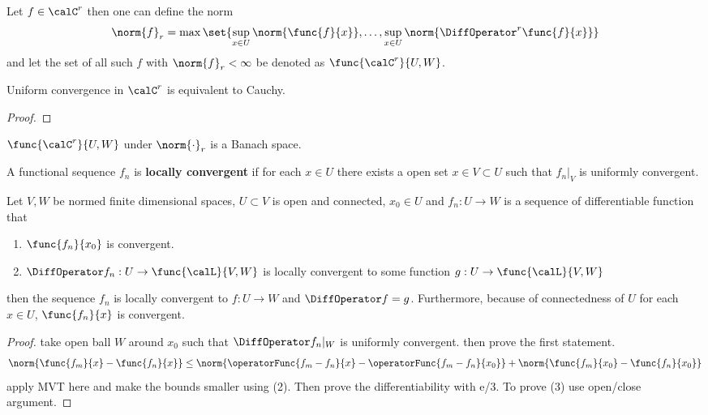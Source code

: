 Let \(f \in \calC^r\) then one can define the norm
\begin{equation*}
    \norm{f}_r = \max \set{\sup_{x \in U}\norm{\func{f}{x}}, \dots , \sup_{x \in U}\norm{\DiffOperator^r \func{f}{x}}}
\end{equation*}
and let the set of all such \(f\) with \(\norm{f}_r < \infty\) be denoted as \(\func{\calC^r}{U,W}\).

\begin{theorem}
    Uniform convergence in \(\calC^r\) is equivalent to Cauchy.
\end{theorem}

\begin{proof}

\end{proof}

\begin{theorem}
    \( \func{\calC^r}{U,W}\) under \(\norm{\cdot}_r\) is a Banach space.
\end{theorem}


\begin{definition}
    A functional sequence \(f_n\) is \textbf{locally convergent} if for each \(x \in U\)  there exists a open set \(x \in V \subset U\) such that \(\left. f_n \right|_V\) is uniformly convergent.
\end{definition}

\begin{theorem}
    Let \(V,W\) be normed finite dimensional spaces, \(U \subset V\) is open and connected, \(x_0 \in U\) and \(f_n : U \to W\) is a sequence of differentiable function that
    \begin{enumerate}
        \item \(\func{f_n}{x_0}\) is convergent.
        \item \(\DiffOperator f_n : U \to \func{\calL}{V,W}\) is locally convergent to some function \(g : U \to \func{\calL}{V,W}\)
    \end{enumerate}
    then the sequence \(f_n\) is locally convergent to \(f : U \to W\) and \(\DiffOperator f = g\). Furthermore, because of connectedness of \(U\) for each \(x \in U\), \(\func{f_n}{x}\) is convergent.
\end{theorem}

\begin{proof}
    take open ball \(W\) around \(x_0\) such that \(\DiffOperator f_n|_W\) is uniformly convergent. then prove the first statement.
    \begin{equation*}
        \norm{\func{f_m}{x} - \func{f_n}{x}} \leq \norm{\operatorFunc{f_m - f_n}{x} - \operatorFunc{f_m - f_n}{x_0}} + \norm{\func{f_m}{x_0} - \func{f_n}{x_0}}
    \end{equation*}
    apply MVT here and make the bounds smaller using (2). Then prove the differentiability with e/3. To prove (3) use open/close argument.
\end{proof}

